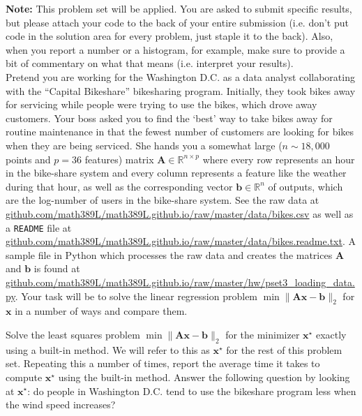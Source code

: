 \documentclass[12pt,letterpaper,cm]{hmcpset}
\newcommand\A{\boldsymbol{A}}
\renewcommand\b{\boldsymbol{b}}
\newcommand\x{\boldsymbol{x}}
\begin{document}
\textbf{Note:} This problem set will be applied. You are asked to submit specific results, but please attach your code to the back of your entire submission (i.e. don't put code in the solution area for every problem, just staple it to the back). Also, when you report a number or a histogram, for example, make sure to provide a bit of commentary on what that means (i.e. interpret your results).\\

Pretend you are working for the Washington D.C. as a data analyst collaborating with the ``Capital Bikeshare'' bikesharing program. Initially, they took bikes away for servicing while people were trying to use the bikes, which drove away customers. Your boss asked you to find the `best' way to take bikes away for routine maintenance in that the fewest number of customers are looking for bikes when they are being serviced. She hands you a somewhat large ($n\sim 18,000$ points and $p=36$ features) matrix $\A\in\mathbb{R}^{n\times p}$ where every row represents an hour in the bike-share system and every column represents a feature like the weather during that hour, as well as the corresponding vector $\b\in\mathbb{R}^n$ of outputs, which are the log-number of users in the bike-share system. See the raw data at \url{github.com/math389L/math389L.github.io/raw/master/data/bikes.csv} as well as a \verb+README+ file at \url{github.com/math389L/math389L.github.io/raw/master/data/bikes.readme.txt}. A sample file in Python which processes the raw data and creates the matrices $\A$ and $\b$ is found at \url{github.com/math389L/math389L.github.io/raw/master/hw/pset3_loading_data.py}. Your task will be to solve the linear regression problem $\min\|\A\x - \b\|_2$ for $\x$ in a number of ways and compare them.

\begin{problem}[1]
    Solve the least squares problem $\min\|\A\x - \b\|_2$ for the minimizer $\x^\star$ exactly using a built-in method. We will refer to this as $\x^\star$ for the rest of this problem set. Repeating this a number of times, report the average time it takes to compute $\x^\star$ using the built-in method. Answer the following question by looking at $\x^\star$: do people in Washington D.C. tend to use the bikeshare program less when the wind speed increases?
\end{problem}

\begin{solution}
\end{solution}
\end{document}
